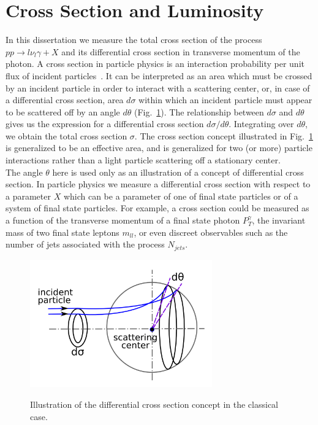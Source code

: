 \section{Cross Section and Luminosity}
\label{sec:WgAbout_LumiAndCS}

In this dissertation we measure the total cross section of the process $pp \rightarrow l \nu_l \gamma + X$ and its differential cross section in transverse momentum of the photon. A cross section in particle physics is an interaction probability per unit flux of incident particles~\cite{ref_fnal_LumiCS}. It can be interpreted as an area which must be crossed by an incident particle in order to interact with a scattering center, or, in case of a differential cross section, area $d\sigma$ within which an incident particle must appear to be scattered off by an angle $d\theta$ (Fig.~\ref{fig:CSclassical}). The relationship between $d\sigma$ and $d\theta$ gives us the expression for a differential cross section $d\sigma/d\theta$. Integrating over $d\theta$, we obtain the total cross section $\sigma$. The cross section concept illustrated in Fig.~\ref{fig:CSclassical} is generalized to be an effective area, and is generalized for two (or more) particle interactions rather than a light particle scattering off a stationary center. \\
The angle $\theta$ here is used only as an illustration of a concept of differential cross section. In particle physics we measure a differential cross section with respect to a parameter $X$ which can be a parameter of one of final state particles or of a system of final state particles. For example, a cross section could be measured as a function of the transverse momentum of a final state photon $P_T^\gamma$, the invariant mass of two final state leptons $m_{ll}$, or even discreet observables such as the number of jets associated with the process $N_{jets}$. \\
\begin{figure}[htb]
  \begin{center}
    {\includegraphics[width=0.70\textwidth]{../figs/WgAbout/CSclassical.png}}
    \caption{Illustration of the differential cross section concept in the classical case.}
    \label{fig:CSclassical}
  \end{center}
\end{figure}
